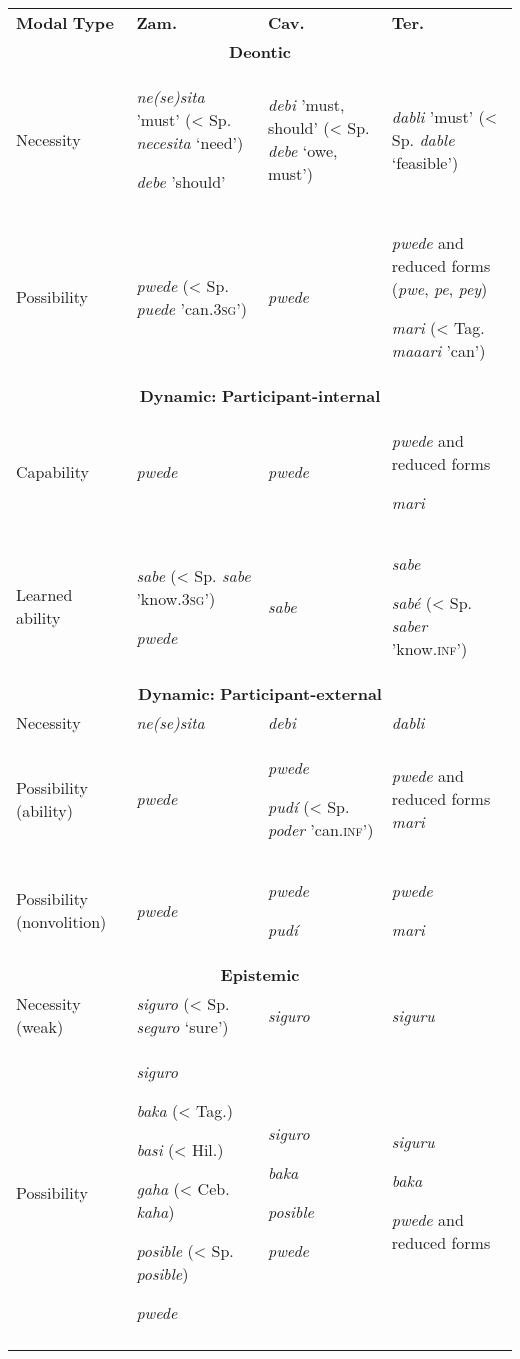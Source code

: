 \documentclass[output=paper]{langsci/langscibook}
\begin{document}
\begin{tabularx}{\textwidth}{XXXX}

\lsptoprule

\textbf{Modal} \textbf{Type} & \textbf{Zam.} & \textbf{Cav.} & \textbf{Ter.}\\
\multicolumn{4}{c}{\textbf{Deontic} }\\
Necessity & \textit{ne(se)sita}  {}'must' (< Sp. \textit{necesita} ‘need’)

\textit{debe} 'should' & \textit{debi} {}'must, should' (< Sp. \textit{debe} ‘owe, must’) & \textit{dabli} 'must' (< Sp. \textit{dable} ‘feasible’)\\
Possibility & \textit{pwede} (< Sp. \textit{puede} 'can.3\textsc{sg}{}') & \textit{pwede} & \textit{pwede} and reduced forms (\textit{pwe}, \textit{pe}, \textit{pey})

\textit{mari} (< Tag. \textit{maaari} {}'can')\\
\multicolumn{4}{c}{\textbf{Dynamic:} \textbf{Participant-internal}}\\
Capability & \textit{pwede} & \textit{pwede} & \textit{pwede} and reduced forms

\textit{mari}\\
Learned ability & \textit{sabe} (< Sp. \textit{sabe} 'know.3\textsc{sg}{}')

\textit{pwede} & \textit{sabe} & \textit{sabe}

\textit{sabé} (< Sp. \textit{saber} 'know.\textsc{inf}{}')\\
\multicolumn{4}{c}{\textbf{Dynamic:} \textbf{Participant-external}}\\
Necessity & \textit{ne(se)sita} & \textit{debi} & \textit{dabli} \\
Possibility (ability) & \textit{pwede} & \textit{pwede}

\textit{pudí} (< Sp. \textit{poder} 'can.\textsc{inf}{}') & \textit{pwede} and reduced forms \textit{mari}  \\
Possibility (nonvolition) & \textit{pwede} & \textit{pwede}

\textit{pudí} & \textit{pwede} 

\textit{mari} \\
\multicolumn{4}{c}{\textbf{Epistemic}}\\
Necessity (weak) & \textit{siguro} (< Sp. \textit{seguro} ‘sure’) & \textit{siguro} & \textit{siguru}\\
Possibility & \textit{siguro}

\textit{baka} (< Tag.)

\textit{basi} (< Hil.)

\textit{gaha} (< Ceb. \textit{kaha})

\textit{posible} (< Sp. \textit{posible})

\textit{pwede} & \textit{siguro}

\textit{baka}

\textit{posible}

\textit{pwede} & \textit{siguru}

\textit{baka}

\textit{pwede} and reduced forms\\
\lspbottomrule
\end{tabularx}
\end{document}

